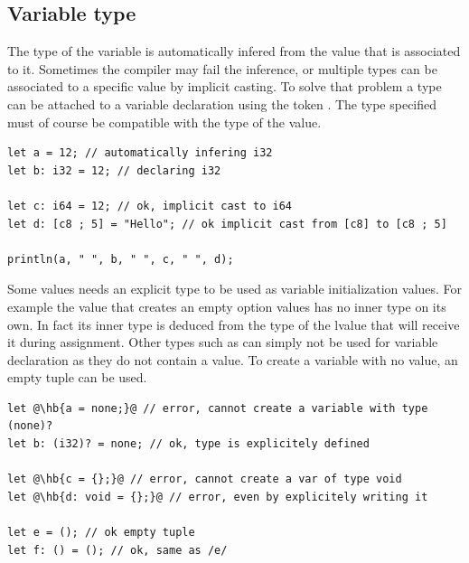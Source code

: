 \subsection{Variable type}
\label{sec:memory:variable_type}

The type of the variable is automatically infered from the value that is
associated to it. Sometimes the compiler may fail the inference, or multiple
types can be associated to a specific value by implicit casting. To solve that
problem a type can be attached to a variable declaration using the token
\token{:}. The type specified must of course be compatible with the type of the
value.

\begin{lstlisting}[style=coloredverbatim, escapechar=@]
let a = 12; // automatically infering i32
let b: i32 = 12; // declaring i32

let c: i64 = 12; // ok, implicit cast to i64
let d: [c8 ; 5] = "Hello"; // ok implicit cast from [c8] to [c8 ; 5]

println(a, " ", b, " ", c, " ", d);
\end{lstlisting}

Some values needs an explicit type to be used as variable initialization values.
For example the value  that creates an empty option values has no
inner type on its own. In fact its inner type is deduced from the type of the
lvalue that will receive it during assignment. Other types such as 
can simply not be used for variable declaration as they do not contain a value.
To create a variable with no value, an empty tuple \token{()} can be used.

\begin{lstlisting}[style=coloredverbatimError, escapechar=@]
let @\hb{a = none;}@ // error, cannot create a variable with type (none)?
let b: (i32)? = none; // ok, type is explicitely defined

let @\hb{c = {};}@ // error, cannot create a var of type void
let @\hb{d: void = {};}@ // error, even by explicitely writing it

let e = (); // ok empty tuple
let f: () = (); // ok, same as /e/
\end{lstlisting}


\vfill%
\pagebreak
